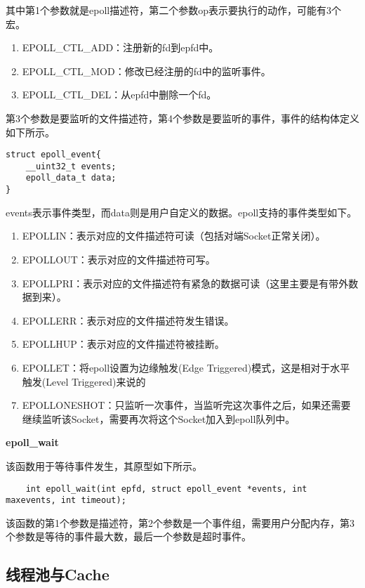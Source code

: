 \documentclass[bachelor]{thesis-uestc}
\begin{document}
其中第1个参数就是epoll描述符，第二个参数op表示要执行的动作，可能有3个宏。
\begin{enumerate}
	\item EPOLL\_CTL\_ADD：注册新的fd到epfd中。
	\item EPOLL\_CTL\_MOD：修改已经注册的fd中的监听事件。
	\item EPOLL\_CTL\_DEL：从epfd中删除一个fd。
\end{enumerate}

第3个参数是要监听的文件描述符，第4个参数是要监听的事件，事件的结构体定义如下所示。

\begin{lstlisting}
struct epoll_event{
	__uint32_t events;
	epoll_data_t data;
}
\end{lstlisting}

events表示事件类型，而data则是用户自定义的数据。epoll支持的事件类型如下。
\begin{enumerate}
	\item EPOLLIN：表示对应的文件描述符可读（包括对端Socket正常关闭）。
	\item EPOLLOUT：表示对应的文件描述符可写。
	\item EPOLLPRI：表示对应的文件描述符有紧急的数据可读（这里主要是有带外数据到来）。
	\item EPOLLERR：表示对应的文件描述符发生错误。
	\item EPOLLHUP：表示对应的文件描述符被挂断。
	\item EPOLLET：将epoll设置为边缘触发(Edge Triggered)模式，这是相对于水平触发(Level Triggered)来说的
	\item EPOLLONESHOT：只监听一次事件，当监听完这次事件之后，如果还需要继续监听该Socket，需要再次将这个Socket加入到epoll队列中。
\end{enumerate}

\textbf{epoll\_wait}

该函数用于等待事件发生，其原型如下所示。

\begin{lstlisting}
	int epoll_wait(int epfd, struct epoll_event *events, int maxevents, int timeout);
\end{lstlisting}

该函数的第1个参数是描述符，第2个参数是一个事件组，需要用户分配内存，第3个参数是等待的事件最大数，最后一个参数是超时事件。

\subsection{线程池与Cache}
\end{document}
